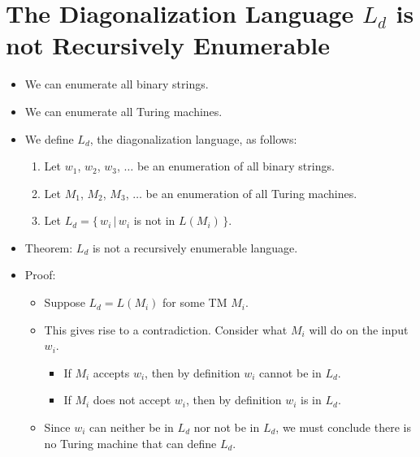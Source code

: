 \documentclass[]{article}
\begin{document}
\section{The Diagonalization Language $L_d$ is not Recursively Enumerable}
  \begin{itemize}
    \item We can enumerate all binary strings.
    \item We can enumerate all Turing machines.
    \item We define $L_d$, the diagonalization language, as follows:
      \begin{enumerate}
        \item Let $w_1$, $w_2$, $w_3$, $\ldots$ be an enumeration of all binary
        strings.
        \item Let $M_1$, $M_2$, $M_3$, $\ldots$ be an enumeration of all Turing
        machines.
        \item Let $L_d = \{\,w_i\,|\,w_i$ is not in $L(M_i)\,\}$.
      \end{enumerate}
    \item Theorem: $L_d$ is not a recursively enumerable language.
    \item Proof:
      \begin{itemize}
        \item Suppose $L_d = L(M_i)$ for some TM $M_i$.
        \item This gives rise to a contradiction. Consider what $M_i$ will do on
        the input $w_i$.
          \begin{itemize}
            \item If $M_i$ accepts $w_i$, then by definition $w_i$ cannot be in
            $L_d$.
            \item If $M_i$ does not accept $w_i$, then by definition $w_i$ is in
            $L_d$.
          \end{itemize}
        \item Since $w_i$ can neither be in $L_d$ nor not be in $L_d$, we must
        conclude there is no Turing machine that can define $L_d$.
      \end{itemize}
  \end{itemize}
\end{document}
